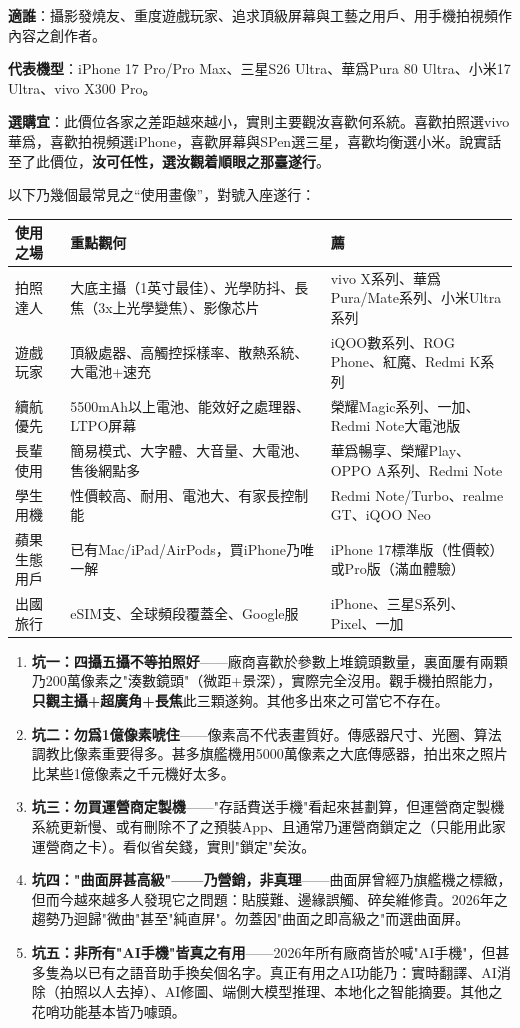 \textbf{適誰}：攝影發燒友、重度遊戲玩家、追求頂級屏幕與工藝之用戶、用手機拍視頻作內容之創作者。

\textbf{代表機型}：iPhone 17 Pro/Pro Max、三星S26 Ultra、華爲Pura 80 Ultra、小米17 Ultra、vivo X300 Pro。

\textbf{選購宜}：此價位各家之差距越來越小，實則主要觀汝喜歡何系統。喜歡拍照選vivo華爲，喜歡拍視頻選iPhone，喜歡屏幕與SPen選三星，喜歡均衡選小米。說實話至了此價位，\textbf{汝可任性，選汝觀着順眼之那臺遂行}。


以下乃幾個最常見之“使用畫像”，對號入座遂行：

\begin{center}
\begin{tabularx}{\linewidth}{|X|X|X|}
\hline
\textbf{使用之場} & \textbf{重點觀何} & \textbf{薦} \tabularnewline
\hline
拍照達人 & 大底主攝（1英寸最佳）、光學防抖、長焦（3x上光學變焦）、影像芯片 & vivo X系列、華爲Pura/Mate系列、小米Ultra系列 \tabularnewline
遊戲玩家 & 頂級處器、高觸控採樣率、散熱系統、大電池+速充 & iQOO數系列、ROG Phone、紅魔、Redmi K系列 \tabularnewline
續航優先 & 5500mAh以上電池、能效好之處理器、LTPO屏幕 & 榮耀Magic系列、一加、Redmi Note大電池版 \tabularnewline
長輩使用 & 簡易模式、大字體、大音量、大電池、售後網點多 & 華爲暢享、榮耀Play、OPPO A系列、Redmi Note \tabularnewline
學生用機 & 性價較高、耐用、電池大、有家長控制能 & Redmi Note/Turbo、realme GT、iQOO Neo \tabularnewline
蘋果生態用戶 & 已有Mac/iPad/AirPods，買iPhone乃唯一解 & iPhone 17標準版（性價較）或Pro版（滿血體驗） \tabularnewline
出國旅行 & eSIM支、全球頻段覆蓋全、Google服 & iPhone、三星S系列、Pixel、一加 \tabularnewline
\hline
\end{tabularx}
\end{center}


\begin{enumerate}
  \item \textbf{坑一：四攝五攝不等拍照好}——廠商喜歡於參數上堆鏡頭數量，裏面屢有兩顆乃200萬像素之"湊數鏡頭"（微距+景深），實際完全沒用。觀手機拍照能力，\textbf{只觀主攝+超廣角+長焦}此三顆遂夠。其他多出來之可當它不存在。
  \item \textbf{坑二：勿爲1億像素唬住}——像素高不代表畫質好。傳感器尺寸、光圈、算法調教比像素重要得多。甚多旗艦機用5000萬像素之大底傳感器，拍出來之照片比某些1億像素之千元機好太多。
  \item \textbf{坑三：勿買運營商定製機}——"存話費送手機"看起來甚劃算，但運營商定製機系統更新慢、或有刪除不了之預裝App、且通常乃運營商鎖定之（只能用此家運營商之卡）。看似省矣錢，實則"鎖定"矣汝。
  \item \textbf{坑四："曲面屏甚高級"——乃營銷，非真理}——曲面屏曾經乃旗艦機之標緻，但而今越來越多人發現它之問題：貼膜難、邊緣誤觸、碎矣維修貴。2026年之趨勢乃迴歸"微曲"甚至"純直屏"。勿蓋因"曲面之即高級之"而選曲面屏。
  \item \textbf{坑五：非所有"AI手機"皆真之有用}——2026年所有廠商皆於喊"AI手機"，但甚多隻為以已有之語音助手換矣個名字。真正有用之AI功能乃：實時翻譯、AI消除（拍照以人去掉）、AI修圖、端側大模型推理、本地化之智能摘要。其他之花哨功能基本皆乃噱頭。
\end{enumerate}

